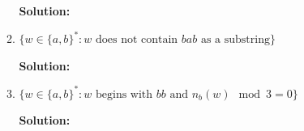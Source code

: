 \documentclass[12pt]{article}
\begin{document}
\begin{spacing}{1.5}
\begin{enumerate}
\begin{enumerate}
                              \textbf{Solution:}

                        \item $\{w \in \{a,b \}^* : w \text{ does not contain $bab$ as a substring} \}$

                              \textbf{Solution:}

                        \item $\{w \in \{a,b\}^* : w \text{ begins with $bb$ and } n_b(w) \mod 3 = 0 \}$

                              \textbf{Solution:}
                  \end{enumerate}

      \end{enumerate}

\end{spacing}
\end{document}
